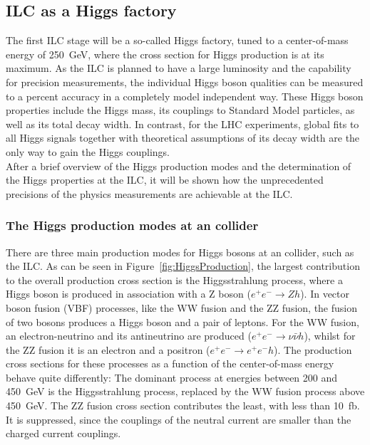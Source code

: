 \subsection{ILC as a Higgs factory}
The first ILC stage will be a so-called Higgs factory, tuned to a center-of-mass energy of \SI{250}{\GeV}, where the cross section for Higgs production is at its maximum.
As the ILC is planned to have a large luminosity and the capability for precision measurements, the individual Higgs boson qualities can be measured to a percent accuracy in a completely model independent way.
These Higgs boson properties include the Higgs mass, its couplings to Standard Model particles, as well as its total decay width.
In contrast, for the LHC experiments, global fits to all Higgs signals together with theoretical assumptions of its decay width are the only way to gain the Higgs couplings.
\\After a brief overview of the Higgs production modes and the determination of the Higgs properties at the ILC, it will be shown how the unprecedented precisions of the physics measurements are achievable at the ILC. 

\subsubsection{\texorpdfstring{The Higgs production modes at an \positron\electron collider}{The Higgs production modes at an electron positron collider}}
There are three main production modes for Higgs bosons at an \positron\electron collider, such as the ILC.
As can be seen in Figure~\ref{fig:HiggsProduction}, the largest contribution to the overall production cross section is the Higgsstrahlung process, where a Higgs boson is produced in association with a Z boson ($e^+e^-\rightarrow Zh$).
In vector boson fusion (VBF) processes, like the WW fusion and the ZZ fusion, the fusion of two bosons produces a Higgs boson and a pair of leptons.
For the WW fusion, an electron-neutrino and its antineutrino are produced ($e^+e^-\rightarrow \nu\bar{\nu} h$), whilst for the ZZ fusion it is an electron and a positron ($e^+e^-\rightarrow e^+e^-h$).
The production cross sections for these processes as a function of the center-of-mass energy behave quite differently:
The dominant process at energies between 200 and \SI{450}{\GeV} is the Higgsstrahlung process, replaced by the WW fusion process above \SI{450}{\GeV}.
The ZZ fusion cross section contributes the least, with less than \SI{10}{fb}.
It is suppressed, since the couplings of the neutral current are smaller than the charged current couplings.

